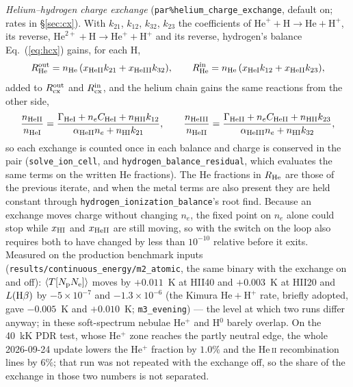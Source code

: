\documentclass[english,a4paper]{my_memo}
\newcommand{\code}[1]{\texttt{#1}}
\begin{document}
\emph{Helium--hydrogen charge exchange} (\code{par\%helium\_charge\_exchange},
default on; rates in \S\ref{sec:cx}).  With $k_{21}$, $k_{12}$, $k_{32}$,
$k_{23}$ the coefficients of $\mathrm{He}^+ + \mathrm{H} \to \mathrm{He} +
\mathrm{H}^+$, its reverse, $\mathrm{He}^{2+} + \mathrm{H} \to \mathrm{He}^+
+ \mathrm{H}^+$ and its reverse, hydrogen's balance Eq.~(\ref{eq:hcx})
gains, for each H,
\begin{equation}
  R_{\rm He}^{\rm out} = n_{\rm He}\,(x_{\rm HeII}k_{21} + x_{\rm HeIII}k_{32}),
  \qquad
  R_{\rm He}^{\rm in} = n_{\rm He}\,(x_{\rm HeI}k_{12} + x_{\rm HeII}k_{23}),
\end{equation}
added to $R_{\rm cx}^{\rm out}$ and $R_{\rm cx}^{\rm in}$, and the helium
chain gains the same reactions from the other side,
\begin{equation}
  \frac{n_{\rm HeII}}{n_{\rm HeI}} =
  \frac{\Gamma_{\rm HeI} + n_e C_{\rm HeI} + n_{\rm HII}k_{12}}
       {\alpha_{\rm HeII} n_e + n_{\rm HI}k_{21}}, \qquad
  \frac{n_{\rm HeIII}}{n_{\rm HeII}} =
  \frac{\Gamma_{\rm HeII} + n_e C_{\rm HeII} + n_{\rm HII}k_{23}}
       {\alpha_{\rm HeIII} n_e + n_{\rm HI}k_{32}},
\end{equation}
so each exchange is counted once in each balance and charge is conserved in
the pair (\code{solve\_ion\_cell}, and \code{hydrogen\_balance\_residual},
which evaluates the same terms on the written He fractions).  The He
fractions in $R_{\rm He}$ are those of the previous iterate, and when the
metal terms are also present they are held constant through
\code{hydrogen\_ionization\_balance}'s root find.  Because an exchange moves
charge without changing $n_e$, the fixed point on $n_e$ alone could stop
while $x_{\rm HI}$ and $x_{\rm HeII}$ are still moving, so with the switch
on the loop also requires both to have changed by less than $10^{-10}$
relative before it exits.  Measured on the production benchmark inputs
(\code{results/continuous\_energy/m2\_atomic}, the same binary with the
exchange on and off): $\langle T[N_{\rm p}N_{\rm e}]\rangle$ moves by
$+0.011$~K at HII40 and $+0.003$~K at HII20 and $L({\rm H}\beta)$ by
$-5\times10^{-7}$ and $-1.3\times10^{-6}$ (the Kimura
$\mathrm{He}+\mathrm{H}^+$ rate, briefly adopted, gave $-0.005$~K and
$+0.010$~K; \code{m3\_evening}) --- the level at which two runs differ
anyway; in these soft-spectrum nebulae He$^{+}$ and H$^{0}$ barely
overlap.  On the 40~kK PDR test, whose He$^{+}$ zone reaches the partly
neutral edge, the whole 2026-09-24 update lowers the He$^{+}$ fraction by
$1.0\%$ and the He\,\textsc{ii} recombination lines by $6\%$; that run was
not repeated with the exchange off, so the share of the exchange in those
two numbers is not separated.
\end{document}
